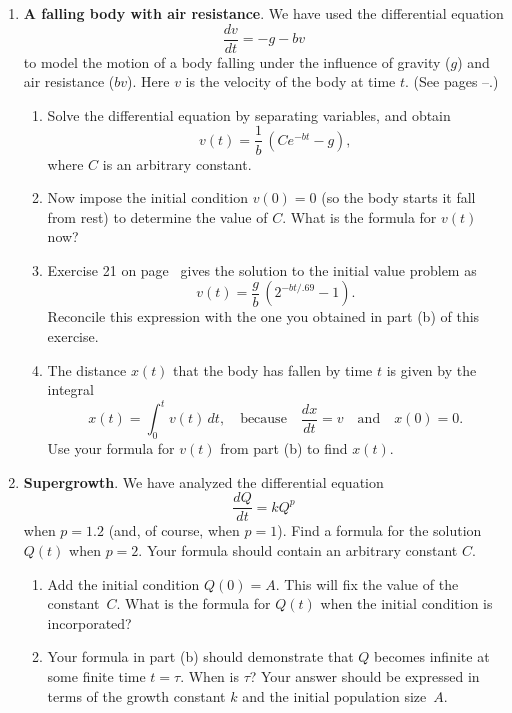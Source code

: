 \begin{enumerate}
\begin{enumerate}
\end{enumerate}
\item {\bf A falling body with air resistance}. We
have used the differential equation
	\[
\dfrac{dv}{dt} = -g -bv
\] to model the motion of a body falling under the influence
        of gravity ($g$) and air resistance ($bv$).  Here $v$ is the
        velocity of the body at time $t$.  (See pages \pageref{fall
          w/air-begin}--\pageref{fall w/air-end}.)


  \begin{enumerate}
  \item Solve the differential equation by separating variables, and obtain
	\[
v(t) = \dfrac{1}{b} \, \left( Ce^{-bt} - g \right),
\]
where $C$ is an arbitrary constant.

  \item Now impose the initial condition $v(0) = 0$ (so the body starts
it fall from rest) to determine the value of $C$.  What is the formula
for $v(t)$ now?

  \item Exercise 21 on page~\pageref{ex:falling body1} gives the solution
to the initial value problem as
	\[
v(t) = \dfrac{g}{b} \, \left( 2^{-bt/.69} - 1 \right).
\]
Reconcile this expression with the one you obtained in part (b) of
this exercise.

  \item The distance $x(t)$ that the body has fallen by time $t$ is given
by the integral
	\[
x(t) = \int_0^t v(t) \, dt, \quad \mbox{because} \quad
		\dfrac{dx}{dt} = v \quad \mbox{and} \quad x(0) = 0.
\]
Use your formula for $v(t)$ from part (b) to find $x(t)$.




\end{enumerate}
\item {\bf Supergrowth}. We have analyzed the
differential equation
	\[
\dfrac{dQ}{dt} = k Q^p
\]
when $p = 1.2$ (and, of course, when $p = 1$).  Find a formula for the
solution $Q(t)$ when $p = 2$.  Your formula should contain an
arbitrary constant $C$.

  \begin{enumerate}
  \item Add the initial condition $Q(0) = A$.  This will fix the value of
the constant~$C$.  What is the formula for $Q(t)$ when the initial
condition is incorporated?

  \item Your formula in part (b) should demonstrate that $Q$ becomes
infinite at some finite time $t = \tau$.  When is $\tau$?  Your answer
should be expressed in terms of the growth constant $k$ and the
initial population size~$A$.


\end{enumerate}
\end{enumerate}
